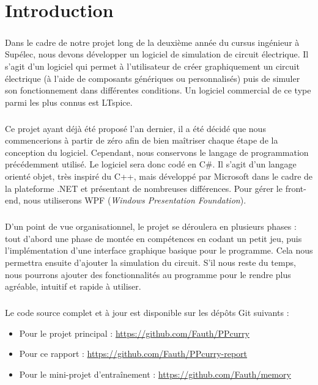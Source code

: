 \chapter*{Introduction}

\paragraph{}Dans le cadre de notre projet long de la deuxième année du cursus ingénieur à Supélec, nous devons développer un logiciel de simulation de circuit électrique. Il s'agit d'un logiciel qui permet à l'utilisateur de créer graphiquement un circuit électrique (à l'aide de composants génériques ou personnalisés) puis de simuler son fonctionnement dans différentes conditions. Un logiciel commercial de ce type parmi les plus connus est LTspice.

\paragraph{}Ce projet ayant déjà été proposé l'an dernier, il a été décidé que nous commencerions à partir de zéro afin de bien maîtriser chaque étape de la conception du logiciel. Cependant, nous conservons le langage de programmation précédemment utilisé. Le logiciel sera donc codé en C\#. Il s'agit d'un langage orienté objet, très inspiré du C++, mais développé par Microsoft dans le cadre de la plateforme .NET et présentant de nombreuses différences. Pour gérer le front-end, nous utiliserons WPF (\textit{Windows Presentation Foundation}).

\paragraph{}D'un point de vue organisationnel, le projet se déroulera en plusieurs phases : tout d'abord une phase de montée en compétences en codant un petit jeu, puis l'implémentation d'une interface graphique basique pour le programme. Cela nous permettra ensuite d'ajouter la simulation du circuit. S'il nous reste du temps, nous pourrons ajouter des fonctionnalités au programme pour le rendre plus agréable, intuitif et rapide à utiliser.

\paragraph{}Le code source complet et à jour est disponible sur les dépôts Git suivants :
\begin{itemize}
	\item Pour le projet principal : \url{https://github.com/Fauth/PPcurry}
	\item Pour ce rapport : \url{https://github.com/Fauth/PPcurry-report}
	\item Pour le mini-projet d'entraînement : \url{https://github.com/Fauth/memory}
\end{itemize}
